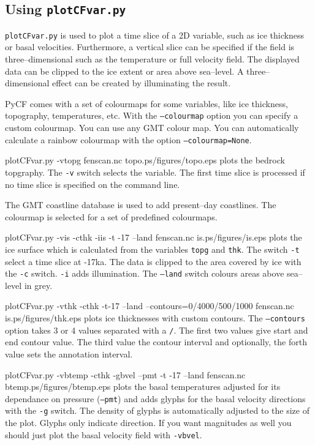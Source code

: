 \subsection{Using \texttt{plotCFvar.py}}
\texttt{plotCFvar.py} is used to plot a time slice of a 2D variable, such as ice thickness or basal velocities. Furthermore, a vertical slice can be specified if the field is three--dimensional such as the temperature or full velocity field. The displayed data can be clipped to the ice extent or area above sea--level. A three--dimensional effect can be created by illuminating the result.

PyCF comes with a set of colourmaps for some variables, like ice thickness, topography, temperatures, etc. With the \texttt{--colourmap} option you can specify a custom colourmap. You can use any GMT colour map. You can automatically calculate a rainbow colourmap with the option \texttt{--colourmap=None}.

\begin{pycf}{plotCFvar.py -vtopg fenscan.nc topo.ps}{\dir/figures/topo.eps}
plots the bedrock topgraphy. The \texttt{-v} switch selects the variable. The first time slice is processed if no time slice is specified on the command line. 

The GMT coastline database is used to add present--day coastlines. The colourmap is selected for a set of predefined colourmaps.
\end{pycf}

\begin{pycf}{plotCFvar.py -vis -cthk -iis -t -17 --land fenscan.nc is.ps}{\dir/figures/is.eps}
plots the ice surface which is calculated from the variables \texttt{topg} and \texttt{thk}. The switch \texttt{-t} select a time slice at -17ka. The data is clipped to the area covered by ice with the \texttt{-c} switch. \texttt{-i} adds illumination. The \texttt{--land} switch colours areas above sea--level in grey.
\end{pycf}

\begin{pycf}{plotCFvar.py -vthk -cthk -t-17 --land --contours=0/4000/500/1000 fenscan.nc is.ps}{\dir/figures/thk.eps}
plots ice thicknesses with custom contours. The \texttt{--contours} option takes 3 or 4 values separated with a \texttt{/}. The first two values give start and end contour value. The third value the contour interval and optionally, the forth value sets the annotation interval.
\end{pycf}

\begin{pycf}{plotCFvar.py -vbtemp -cthk -gbvel --pmt -t -17 --land fenscan.nc btemp.ps}{\dir/figures/btemp.eps}
plots the basal temperatures adjusted for its dependance on pressure (\texttt{--pmt}) and adds glyphs for the basal velocity directions with the \texttt{-g} switch. The density of glyphs is automatically adjusted to the size of the plot. Glyphs only indicate direction. If you want magnitudes as well you should just plot the basal velocity field with \texttt{-vbvel}.
\end{pycf}

